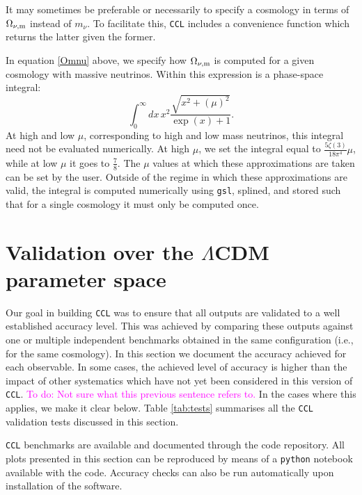 \documentclass[\docopts]{\docclass}
\newcommand{\todo}[1]{\textcolor{magenta}{To do: #1}}
\newcommand{\ccl}{{\tt CCL}\xspace}
\begin{document}
It may sometimes be preferable or necessarily to specify a cosmology in terms of $\Omega_{\nu, {\rm m}}$ instead of $m_\nu$. To facilitate this, \ccl includes a convenience function which returns the latter given the former.

In equation \ref{Omnu} above, we specify how $\Omega_{\nu, {\rm m}}$ is computed for a given cosmology with massive neutrinos. Within this expression is a phase-space integral:
\begin{equation}
\int_0^{\infty} dx \, x^2 \frac{\sqrt{x^2 + \left(\mu\right)^2}}{\exp(x) + 1}.
\label{phasespacenu}
\end{equation}
At high and low $\mu$, corresponding to high and low mass neutrinos, this integral need not be evaluated numerically. At high $\mu$, we set the integral equal to $\frac{5\zeta(3)}{18\pi^4}\mu$, while at low $\mu$ it goes to $\frac{7}{8}$. The $\mu$ values at which these approximations are taken can be set by the user. Outside of the regime in which these approximations are valid, the integral is computed numerically using {\tt gsl}, splined, and stored such that for a single cosmology it must only be computed once.


\section{Validation over the $\Lambda$CDM parameter space}
\label{sec:validation}

Our goal in building \ccl was to ensure that all outputs are validated to a well established accuracy level. This was achieved by comparing these outputs against one or multiple independent benchmarks obtained in the same configuration (i.e., for the same cosmology). In this section we document the accuracy achieved for each observable. In some cases, the achieved level of accuracy is higher than the impact of other systematics which have not yet been considered in this version of \ccl. \todo{Not sure what this previous sentence refers to.} In the cases where this applies, we make it clear below. 
Table \ref{tab:tests} summarises all the \ccl validation tests discussed in this section.



\ccl benchmarks are available and documented through the code repository. All plots presented in this section can be reproduced by means of a {\tt python} notebook available with the code. Accuracy checks can also be run automatically upon installation of the software.
\end{document}
